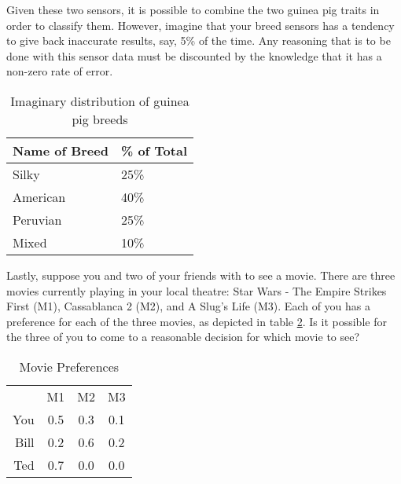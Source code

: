 \documentclass[thesis.tex]{subfiles}
\begin{document}
Given these two sensors, it is possible to combine the two guinea pig traits in order to
classify them. However, imagine that your breed sensors has a tendency to give back inaccurate
results, say, 5\% of the time. Any reasoning that is to be done with this sensor data must be
discounted by the knowledge that it has a non-zero rate of error.

\begin{table}
  \begin{center}
    \begin{tabular}{| l | l |}
      \hline
      Name of Breed & \% of Total \\
      \hline
      Silky         & 25\%        \\
      American      & 40\%        \\
      Peruvian      & 25\%        \\
      Mixed         & 10\%        \\
      \hline
    \end{tabular}
  \end{center}

  \caption{Imaginary distribution of guinea pig breeds}
  \label{tbl:guinea-pig-breeds}
\end{table}

Lastly, suppose you and two of your friends with to see a movie. There are three movies currently
playing in your local theatre: Star Wars - The Empire Strikes First (M1), Cassablanca 2 (M2), and
A Slug's Life (M3). Each of you has a preference for each of the three movies, as depicted in
table \ref{tbl:movies}. Is it possible for the three of you to come to a reasonable decision for
which movie to see?

\begin{table}
  \begin{center}
    \begin{tabular}{ r|c|c|c| }
      \multicolumn{1}{r}{}
      &  \multicolumn{1}{c}{M1}
      &  \multicolumn{1}{c}{M2}
      &  \multicolumn{1}{c}{M3} \\
      \cline{2-4}
      You & 0.5 & 0.3 & 0.1 \\
      \cline{2-4}
      Bill & 0.2 & 0.6 & 0.2 \\
      \cline{2-4}
      Ted  & 0.7 & 0.0 & 0.0 \\
      \cline{2-4}
    \end{tabular}
  \end{center}

  \caption{Movie Preferences}
  \label{tbl:movies}
\end{table}
\end{document}
